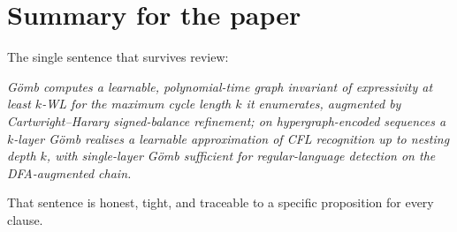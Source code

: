 \documentclass[11pt,a4paper]{article}
\newcommand{\WL}{\textsf{WL}}
\newcommand{\Gomb}{G\"omb}
\begin{document}
\section*{Summary for the paper}

The single sentence that survives review:

\medskip
\noindent\emph{\Gomb{} computes a learnable, polynomial-time graph
invariant of expressivity at least $k$-\WL{} for the maximum cycle
length $k$ it enumerates, augmented by Cartwright--Harary
signed-balance refinement; on hypergraph-encoded sequences a
$k$-layer \Gomb{} realises a learnable approximation of CFL
recognition up to nesting depth $k$, with single-layer \Gomb{}
sufficient for regular-language detection on the DFA-augmented
chain.}
\medskip

That sentence is honest, tight, and traceable to a specific
proposition for every clause.
\end{document}
